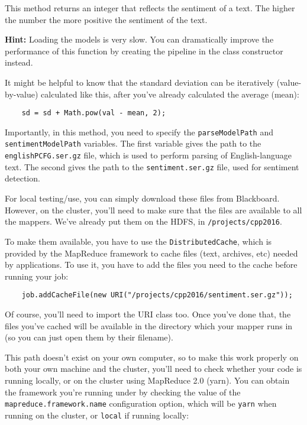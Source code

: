 \documentclass[a4paper,10pt]{article}
\def \year {2016}
\begin{document}
  
  This method returns an integer that reflects the sentiment of a text. The higher the number the more positive the sentiment of the text.
  
  \textbf{Hint:} Loading the models is very slow.  You can dramatically improve the performance of this function by creating the pipeline in the class constructor instead. 
  
  It might be helpful to know that the standard deviation can be iteratively (value-by-value) calculated
  like this, after you've already calculated the average (mean):
  
  \begin{lstlisting}
    sd = sd + Math.pow(val - mean, 2);
  \end{lstlisting}
  
  
  Importantly, in this method, you need to specify the \texttt{parseModelPath} and \texttt{sentimentModelPath} variables. The first variable gives the path to the \texttt{englishPCFG.ser.gz} file, which is used to perform parsing of English-language text.  The second gives the path to the \texttt{sentiment.ser.gz} file, used for sentiment detection. 
  
  For local testing/use, you can simply download these files from Blackboard. However, on the cluster, you'll need to make sure that the files are available to all the mappers. We've already put them on the HDFS, in \texttt{/projects/cpp\year}.
  
  To make them available, you have to use the \texttt{DistributedCache}, which is provided by the MapReduce framework to cache files (text, archives, etc) needed by applications. To use it, you have to add the files you need to the cache before running your job: 
  
  \begin{lstlisting}
    job.addCacheFile(new URI("/projects/cpp2016/sentiment.ser.gz"));
  \end{lstlisting}
  
  
  Of course, you'll need to import the URI class too. Once you've done that, the files you've cached will be available in the directory which your mapper runs in (so you can just open them by their filename). 
  
  This path doesn't exist on your own computer, so to make this work properly on both your own machine and the cluster, you'll need to check whether your code is running locally, or on the cluster using MapReduce 2.0 (yarn). You can obtain the framework you're running under by checking the value of the \texttt{mapreduce.framework.name} configuration option, which will be \texttt{yarn} when running on the cluster, or \texttt{local} if running locally:
  
\end{document}
